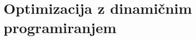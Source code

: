 \section{Optimizacija z dinamičnim programiranjem}\label{sec:optimizacija-z-dinamicnim-programiranjem}